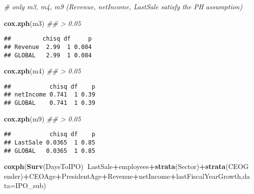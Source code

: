 \documentclass[]{article}
\newenvironment{Shaded}{\begin{snugshade}}{\end{snugshade}}
\newcommand{\CommentTok}[1]{\textcolor[rgb]{0.56,0.35,0.01}{\textit{#1}}}
\newcommand{\DataTypeTok}[1]{\textcolor[rgb]{0.13,0.29,0.53}{#1}}
\newcommand{\KeywordTok}[1]{\textcolor[rgb]{0.13,0.29,0.53}{\textbf{#1}}}
\newcommand{\NormalTok}[1]{#1}
\newcommand{\OperatorTok}[1]{\textcolor[rgb]{0.81,0.36,0.00}{\textbf{#1}}}
\begin{document}
\begin{Shaded}
\begin{Highlighting}[]
\CommentTok{# only m3, m4, m9 (Revenue, netIncome, LastSale satisfy the PH assumption)}

\KeywordTok{cox.zph}\NormalTok{(m3) }\CommentTok{## >  0.05}
\end{Highlighting}
\end{Shaded}

\begin{verbatim}
##         chisq df     p
## Revenue  2.99  1 0.084
## GLOBAL   2.99  1 0.084
\end{verbatim}

\begin{Shaded}
\begin{Highlighting}[]
\KeywordTok{cox.zph}\NormalTok{(m4) }\CommentTok{## >  0.05}
\end{Highlighting}
\end{Shaded}

\begin{verbatim}
##           chisq df    p
## netIncome 0.741  1 0.39
## GLOBAL    0.741  1 0.39
\end{verbatim}

\begin{Shaded}
\begin{Highlighting}[]
\KeywordTok{cox.zph}\NormalTok{(m9) }\CommentTok{## >  0.05}
\end{Highlighting}
\end{Shaded}

\begin{verbatim}
##           chisq df    p
## LastSale 0.0365  1 0.85
## GLOBAL   0.0365  1 0.85
\end{verbatim}

\begin{Shaded}
\begin{Highlighting}[]
\KeywordTok{coxph}\NormalTok{(}\KeywordTok{Surv}\NormalTok{(DaysToIPO)}\OperatorTok{~}\NormalTok{LastSale}\OperatorTok{+}\NormalTok{employees}\OperatorTok{+}\KeywordTok{strata}\NormalTok{(Sector)}\OperatorTok{+}\KeywordTok{strata}\NormalTok{(CEOGender)}\OperatorTok{+}\NormalTok{CEOAge}\OperatorTok{+}\NormalTok{PresidentAge}\OperatorTok{+}\NormalTok{Revenue}\OperatorTok{+}\NormalTok{netIncome}\OperatorTok{+}\NormalTok{lastFiscalYearGrowth,}\DataTypeTok{data=}\NormalTok{IPO_sub)}
\end{Highlighting}
\end{Shaded}
\end{document}
